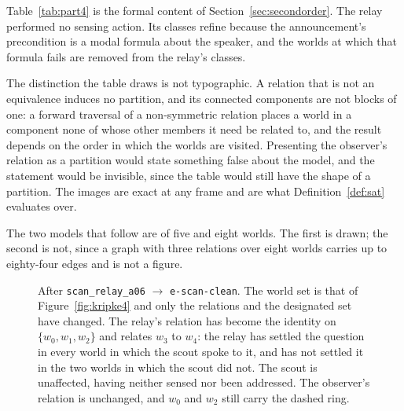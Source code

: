 \documentclass[11pt,a4paper]{article}
\theoremstyle{definition}
\newcommand{\code}[1]{\texttt{\small #1}}
\newcommand{\site}[1]{\code{#1}}
\begin{document}
Table~\ref{tab:part4} is the formal content of
Section~\ref{sec:secondorder}. The relay performed no sensing action. Its
classes refine because the announcement's precondition is a modal formula
about the speaker, and the worlds at which that formula fails are removed from
the relay's classes.

The distinction the table draws is not typographic. A relation that is not an
equivalence induces no partition, and its connected components are not blocks
of one: a forward traversal of a non-symmetric relation places a world in a
component none of whose other members it need be related to, and the result
depends on the order in which the worlds are visited. Presenting the observer's
relation as a partition would state something false about the model, and the
statement would be invisible, since the table would still have the shape of a
partition. The images are exact at any frame and are what
Definition~\ref{def:sat} evaluates over.

The two models that follow are of five and eight worlds. The first is drawn;
the second is not, since a graph with three relations over eight worlds carries
up to eighty-four edges and is not a figure.

\begin{figure}[H]
\centering

\caption{After \code{scan\_relay\_a06} $\to$ \code{e-scan-clean}. The world set
is that of Figure~\ref{fig:kripke4} and only the relations and the designated
set have changed. The relay's relation has become the identity on
$\{w_0, w_1, w_2\}$ and relates $w_3$ to $w_4$: the relay has settled the
question in every world in which the scout spoke to it, and has not settled it
in the two worlds in which the scout did not. The scout is unaffected, having
neither sensed nor been addressed. The observer's relation is unchanged, and
$w_0$ and $w_2$ still carry the dashed ring.}
\label{fig:kripke5}
\end{figure}

\begin{table}[H]
\centering\small
\caption{After \code{scan\_relay\_a06} $\to$ \code{e-scan-clean}. One
designated world remains, and it is the world at which \site{a31} is
contaminated: the relay has eliminated \site{a06} by measurement and
\site{a17} by the scout's announcement, and the exactly-one constraint
supplies the rest. The observer's relation is unchanged by a sensing action it
is not party to.}
\label{tab:part5}

\end{table}
\end{document}
